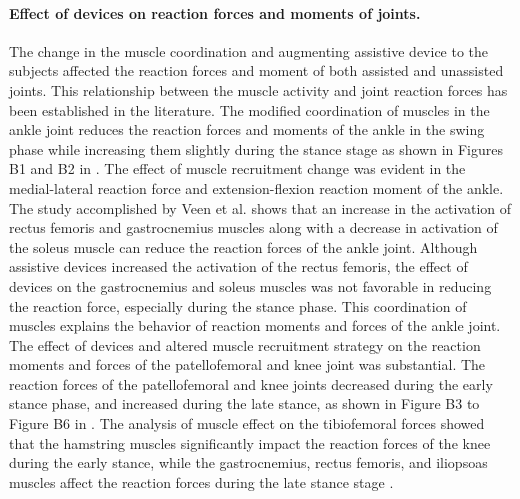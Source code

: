 \documentclass[10pt,letterpaper]{article}
\begin{document}
\paragraph*{Effect of devices on reaction forces and moments of joints.} The change in the muscle coordination and augmenting assistive device to the subjects affected the reaction forces and moment of both assisted and unassisted joints. This relationship between the muscle activity and joint reaction forces has been established in the literature\cite{171,170,173,174}. The modified coordination of muscles in the ankle joint reduces the reaction forces and moments of the ankle in the swing phase while increasing them slightly during the stance stage as shown in Figures B1 and B2 in . The effect of muscle recruitment change was evident in the medial-lateral reaction force and extension-flexion reaction moment of the ankle. The study accomplished by Veen et al. \cite{170} shows that an increase in the activation of rectus femoris and gastrocnemius muscles along with a decrease in activation of the soleus muscle can reduce the reaction forces of the ankle joint. Although assistive devices increased the activation of the rectus femoris, the effect of devices on the gastrocnemius and soleus muscles was not favorable in reducing the reaction force, especially during the stance phase. This coordination of muscles explains the behavior of reaction moments and forces of the ankle joint.\\
The effect of devices and altered muscle recruitment strategy on the reaction moments and forces of the patellofemoral and knee joint was substantial. The reaction forces of the patellofemoral and knee joints decreased during the early stance phase, and increased during the late stance, as shown in Figure B3 to Figure B6 in . The analysis of muscle effect on the tibiofemoral forces showed that the hamstring muscles significantly impact the reaction forces of the knee during the early stance, while the gastrocnemius, rectus femoris, and iliopsoas muscles affect the reaction forces during the late stance stage \cite{171,170}.\\
\end{document}
